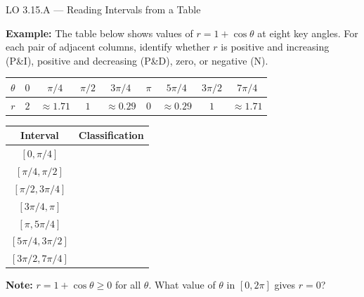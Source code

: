 \documentclass[10pt]{article}
\begin{document}
\begin{notesbox}{LO 3.15.A --- Reading Intervals from a Table}

\textbf{Example:} The table below shows values of $r = 1 + \cos\theta$ at eight key angles.
For each pair of adjacent columns, identify whether $r$ is positive and increasing (P\&I),
positive and decreasing (P\&D), zero, or negative (N).

\vspace{6pt}
\renewcommand{\arraystretch}{1.4}
\begin{tabular}{|c|c|c|c|c|c|c|c|c|}
\hline
$\theta$ & $0$ & $\pi/4$ & $\pi/2$ & $3\pi/4$ & $\pi$ & $5\pi/4$ & $3\pi/2$ & $7\pi/4$ \\
\hline
$r$ & $2$ & $\approx 1.71$ & $1$ & $\approx 0.29$ & $0$ & $\approx 0.29$ & $1$ & $\approx 1.71$ \\
\hline
\end{tabular}

\vspace{8pt}
\begin{tabular}{|c|p{4cm}|}
\hline
\textbf{Interval} & \textbf{Classification} \\
\hline
$[0, \pi/4]$ & \underline{\hspace{3.5cm}} \\
\hline
$[\pi/4, \pi/2]$ & \underline{\hspace{3.5cm}} \\
\hline
$[\pi/2, 3\pi/4]$ & \underline{\hspace{3.5cm}} \\
\hline
$[3\pi/4, \pi]$ & \underline{\hspace{3.5cm}} \\
\hline
$[\pi, 5\pi/4]$ & \underline{\hspace{3.5cm}} \\
\hline
$[5\pi/4, 3\pi/2]$ & \underline{\hspace{3.5cm}} \\
\hline
$[3\pi/2, 7\pi/4]$ & \underline{\hspace{3.5cm}} \\
\hline
\end{tabular}

\vspace{6pt}
\textbf{Note:} $r = 1 + \cos\theta \geq 0$ for all $\theta$. What value of $\theta$ in
$[0, 2\pi]$ gives $r = 0$? \underline{\hspace{2.5cm}}

\end{notesbox}
\end{document}

